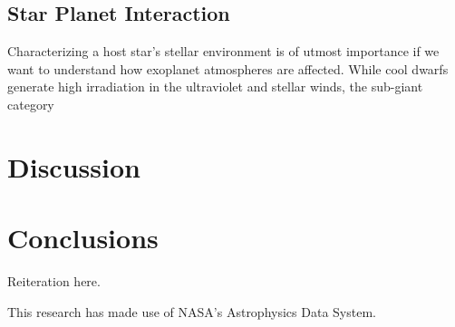 \documentclass[modern]{aastex631}
\begin{document}
\subsection{Star Planet Interaction}
Characterizing a host star's stellar environment is of utmost importance if we want to understand how exoplanet atmospheres are affected. While cool dwarfs generate high irradiation in the ultraviolet and stellar winds, the sub-giant category

\section{Discussion}

\section{Conclusions}

Reiteration here.

\clearpage
\pagebreak


\appendix


\begin{acknowledgements}
    This research has made use of NASA’s Astrophysics Data System.
\end{acknowledgements}




\clearpage



\end{document}
